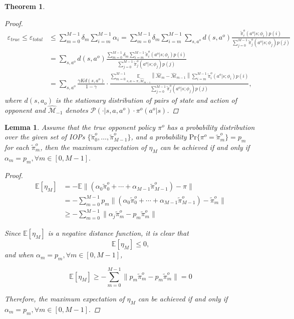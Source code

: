 \documentclass{article}
\newtheorem{theorem}{Theorem}
\newtheorem{lemma}{Lemma}
\begin{document}
\begin{theorem}
\begin{proof}
\begin{align*}
\varepsilon_{true}\leq\varepsilon_{total} & \leq \sum\limits_{m=0}^{M-1}\delta_m\sum\limits_{i=m}^{M-1}\alpha_i = \sum\limits_{m=0}^{M-1}\delta_m\sum\limits_{i=m}^{M-1}\sum\limits_{s,a^o}d(s,a^o) \frac{\tilde{\pi}^o_i\left(a^{o} | s ; \phi_{i}\right) p(i)}{\sum\limits_{j=0}^{M-1}\tilde{\pi}^o_j\left(a^{o} | s ; \phi_{j}\right) p(j)}\\
& = \sum\limits_{s,a^o}d(s,a^o)\frac{\sum\limits_{m=0}^{M-1}\delta_m\sum\limits_{i=m}^{M-1}\tilde{\pi}^o_i\left(a^{o} | s ; \phi_{i}\right) p(i)}{\sum\limits_{j=0}^{M-1}\tilde{\pi}^o_j\left(a^{o} | s ; \phi_{j}\right) p(j)}\\
& = \sum\limits_{s,a^o}\frac{\gamma K d(s,a^o)}{1-\gamma}
  \cdot \frac{\sum\limits_{m=0}^{M-1}\underset{s,a\sim\pi,\widehat{\mathcal{M}}_{m-1}}{\mathbb{E}}\left\|\widehat{\mathcal{M}}_m-\widehat{\mathcal{M}}_{m-1}\right\|\sum\limits_{i=m}^{M-1}\tilde{\pi}^o_i\left(a^{o} | s ; \phi_{i}\right) p(i)}{\sum\limits_{j=0}^{M-1}\tilde{\pi}^o_j\left(a^{o} | s ; \phi_{j}\right) p(j)},
\end{align*}
where $d(s,a_o)$ is the stationary distribution of pairs of state and action of opponent and $\widehat{\mathcal{M}}_{-1}$ denotes $\mathcal{P}(\cdot|s,a,a^o) \cdot \pi^o(a^o|s)$.
\end{proof}
\end{theorem}

\begin{lemma}
Assume that the true opponent policy $\pi^o$ has a probability distribution over the given set of IOPs $\{\tilde{\pi}^o_0,\ldots,\tilde{\pi}^o_{M-1}\}$, and a probability $\mathrm{Pr}\{\pi^o=\tilde{\pi}_m^o\} = p_m$ for each $\tilde{\pi}_m^o$, then the maximum expectation of $\eta_M$ can be achieved if and only if $\alpha_m=p_m, \forall m\in[0,M-1].$

\begin{proof}
\begin{align*}
\mathbb{E}[\eta_M] &= -\mathbb{E}\|(\alpha_0\tilde{\pi}^o_0+\cdots+\alpha_{M-1}\tilde{\pi}^o_{M-1})-\pi\|\\
&=-\sum_{m=0}^{M-1}p_m\|(\alpha_0\tilde{\pi}^o_0+\cdots+\alpha_{M-1}\tilde{\pi}^o_{M-1})-\tilde{\pi}^o_m\|\\
&\geq -\sum_{m=0}^{M-1}\|\alpha_j\tilde{\pi}^o_m-p_m\tilde{\pi}^o_m\|
\end{align*}

Since $\mathbb{E}[\eta_M]$ is a negative distance function, it is clear that 
\begin{equation*}
\mathbb{E}[\eta_M]\leq 0,
\end{equation*}
and when $\alpha_m=p_m, \forall m\in[0,M-1]$, 

\begin{equation*}
    \mathbb{E}[\eta_M] \geq -\sum_{m=0}^{M-1}\|p_m\tilde{\pi}^o_m-p_m\tilde{\pi}^o_m\| = 0
\end{equation*}

Therefore, the maximum expectation of $\eta_M$ can be achieved if and only if $\alpha_m=p_m, \forall m\in[0,M-1].$
\end{proof}
\end{lemma}
\end{document}
